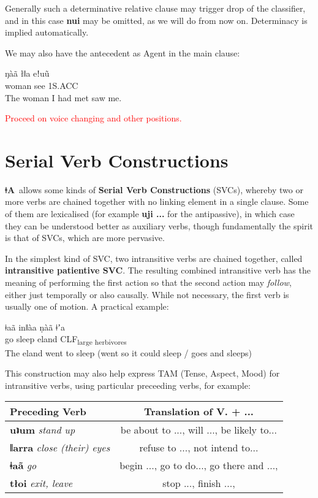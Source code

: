 \documentclass[11pt]{book}
\newcommand{\qcn}[1]{\textbf{#1}}
\newcommand{\langname}{\qcn{ǂA}~}
\newcommand{\transl}[2]{\qcn{#1} \emph{#2}}
\newcommand{\grammsc}[1]{\textsc{#1}}
\newcommand{\CLF}[1]{\grammsc{CLF}\textsubscript{#1}}
\newcommand{\ERG}{\grammsc{ERG}}
\newcommand{\ACC}{\grammsc{ACC}}
\newcommand{\cmnt}[1]{\textcolor{red}{#1}}
\begin{document}
Generally such a determinative relative clause may trigger drop of the classifier, and in this case \qcn{nui} may be omitted, as we will do from now on. Determinacy is implied automatically.

We may also have the antecedent as Agent in the main clause:

\begin{exe}
\ex
{} ŋàã łǁa eǃuũ \\
[ 1S.\ERG{} before meet ] woman see 1S.\ACC{} \\
\glt The woman I had met saw me.
\end{exe}

\cmnt{Proceed on voice changing and other positions.}

\section{Serial Verb Constructions}

\langname allows some kinds of \textbf{Serial Verb Constructions} (SVCs), whereby two or more verbs are chained together with no linking element in a single clause. Some of them are lexicalised (for example \qcn{uji ...} for the antipassive), in which case they can be understood better as auxiliary verbs, though fundamentally the spirit is that of SVCs, which are more pervasive.

In the simplest kind of SVC, two intransitive verbs are chained together, called \textbf{intransitive patientive SVC}. The resulting combined intransitive verb has the meaning of performing the first action so that the second action may \emph{follow}, either just temporally or also causally. While not necessary, the first verb is usually one of motion. A practical example:

\begin{exe}
\ex
\gll ǂaã inǁàa ṇàã ǂʼa \\
go sleep eland \CLF{large herbivores}\\
\glt The eland went to sleep (went so it could sleep / goes and sleeps)
\end{exe}

This construction may also help express TAM (Tense, Aspect, Mood) for intransitive verbs, using particular preceeding verbs, for example:

\begin{center}
\begin{tabular}{|l|c|}
\hline
Preceding Verb  & Translation of V. + ...\\ \hline\hline
 \transl{uʇum}{stand up} & be about to ..., will ..., be likely to...\\ \hline
\transl{ǁarra}{close (their) eyes} & refuse to ..., not intend to...\\ \hline
\transl{ǂaã}{go} & begin ..., go to do..., go there and ..., \\ \hline
\transl{tłoi}{exit, leave} & stop ..., finish ..., \\ \hline
\end{tabular}
\end{center}
\end{document}
